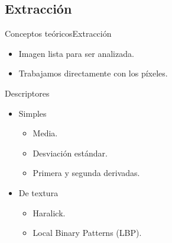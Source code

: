 \documentclass[10pt]{beamer}
\newcommand{\arrowright}{%
\tikz [baseline=-0.5ex]{\node [myarrow] {};}
}
\begin{document}
\subsection{Extracción}
\begin{frame}{Conceptos teóricos}{Extracción}

\begin{itemize}
\item Imagen lista para ser analizada.
\item Trabajamos directamente con los píxeles.
\end{itemize}

\pause

\begin{block}{Descriptores}

\begin{itemize}
\item \alert{Simples}
	\begin{itemize}
	\item Media.
	\item Desviación estándar.
	\item Primera y segunda derivadas.\newline
	\end{itemize}
\item \alert{De textura}
	\begin{itemize}
	\item Haralick.
	\item Local Binary Patterns (LBP).
	\end{itemize}
\end{itemize}

\end{block}

\end{frame}

%
%
%
\end{document}
